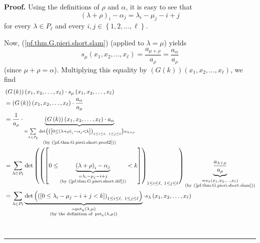 \documentclass[numbers=enddot,12pt,final,onecolumn,notitlepage]{scrartcl}%
\theoremstyle{definition}
\newenvironment{proof}[1][Proof]{\noindent\textbf{#1.} }{\ \rule{0.5em}{0.5em}}
\let\sumnonlimits\sum
\renewcommand{\sum}{\sumnonlimits\limits}
\newenvironment{vershort}{}{}
\begin{document}
\begin{vershort}
\begin{proof}
Using the definitions of $\rho$ and $\alpha$, it is easy to see that
\begin{equation}
\left(  \lambda+\rho\right)  _{i}-\alpha_{j}=\lambda_{i}-\mu_{j}-i+j
\label{pf.thm.G.pieri.short.dif}%
\end{equation}
for every $\lambda\in P_{\ell}$ and every $i,j\in\left\{  1,2,\ldots
,\ell\right\}  $.

Now, (\ref{pf.thm.G.pieri.short.slam}) (applied to $\lambda=\mu$) yields%
\[
s_{\mu}\left(  x_{1},x_{2},\ldots,x_{\ell}\right)  =\dfrac{a_{\mu+\rho}%
}{a_{\rho}}=\dfrac{a_{\alpha}}{a_{\rho}}%
\]
(since $\mu+\rho=\alpha$). Multiplying this equality by $\left(  G\left(
k\right)  \right)  \left(  x_{1},x_{2},\ldots,x_{\ell}\right)  $, we find%
\begin{align*}
&  \left(  G\left(  k\right)  \right)  \left(  x_{1},x_{2},\ldots,x_{\ell
}\right)  \cdot s_{\mu}\left(  x_{1},x_{2},\ldots,x_{\ell}\right) \\
&  =\left(  G\left(  k\right)  \right)  \left(  x_{1},x_{2},\ldots,x_{\ell
}\right)  \cdot\dfrac{a_{\alpha}}{a_{\rho}}\\
&  =\dfrac{1}{a_{\rho}}\cdot\underbrace{\left(  G\left(  k\right)  \right)
\left(  x_{1},x_{2},\ldots,x_{\ell}\right)  \cdot a_{\alpha}}_{\substack{=\sum
_{\lambda\in P_{\ell}}\det\left(  \left(  \left[  0\leq\left(  \lambda
+\rho\right)  _{i}-\alpha_{j}<k\right]  \right)  _{1\leq i\leq\ell,\ 1\leq
j\leq\ell}\right)  a_{\lambda+\rho}\\\text{(by
(\ref{pf.thm.G.pieri.short.prod2}))}}}\\
&  =\sum_{\lambda\in P_{\ell}}\det\left(  \left(  \left[  0\leq
\underbrace{\left(  \lambda+\rho\right)  _{i}-\alpha_{j}}_{\substack{=\lambda
_{i}-\mu_{j}-i+j\\\text{(by (\ref{pf.thm.G.pieri.short.dif}))}}}<k\right]
\right)  _{1\leq i\leq\ell,\ 1\leq j\leq\ell}\right)  \underbrace{\dfrac
{a_{\lambda+\rho}}{a_{\rho}}}_{\substack{=s_{\lambda}\left(  x_{1}%
,x_{2},\ldots,x_{\ell}\right)  \\\text{(by (\ref{pf.thm.G.pieri.short.slam}%
))}}}\\
&  =\sum_{\lambda\in P_{\ell}}\underbrace{\det\left(  \left(  \left[
0\leq\lambda_{i}-\mu_{j}-i+j<k\right]  \right)  _{1\leq i\leq\ell,\ 1\leq
j\leq\ell}\right)  }_{\substack{=\operatorname*{pet}\nolimits_{k}\left(
\lambda,\mu\right)  \\\text{(by the definition of }\operatorname*{pet}%
\nolimits_{k}\left(  \lambda,\mu\right)  \text{)}}}\cdot s_{\lambda}\left(
x_{1},x_{2},\ldots,x_{\ell}\right) \\

\end{align*}
\end{proof}
\end{vershort}
\end{document}
